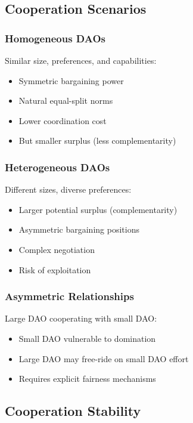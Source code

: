 \subsection{Cooperation Scenarios}

\subsubsection{Homogeneous DAOs}

Similar size, preferences, and capabilities:
\begin{itemize}
    \item Symmetric bargaining power
    \item Natural equal-split norms
    \item Lower coordination cost
    \item But smaller surplus (less complementarity)
\end{itemize}

\subsubsection{Heterogeneous DAOs}

Different sizes, diverse preferences:
\begin{itemize}
    \item Larger potential surplus (complementarity)
    \item Asymmetric bargaining positions
    \item Complex negotiation
    \item Risk of exploitation
\end{itemize}

\subsubsection{Asymmetric Relationships}

Large DAO cooperating with small DAO:
\begin{itemize}
    \item Small DAO vulnerable to domination
    \item Large DAO may free-ride on small DAO effort
    \item Requires explicit fairness mechanisms
\end{itemize}

\subsection{Cooperation Stability}

